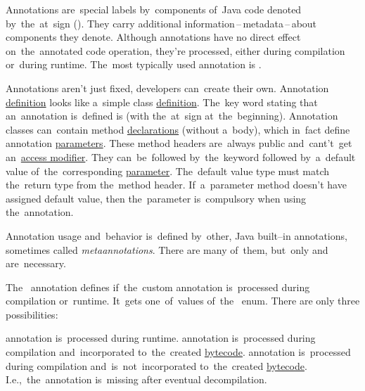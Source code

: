 
\label{javaabstractclasses}

\label{javainterfaces}

\label{javaannotation}
Annotations are~special labels by~components of~Java code denoted by~the~at~sign ().
They carry additional information\,--\,metadata\,--\,about components they denote.
Although annotations have no direct effect on~the~annotated code operation, they're processed, either during compilation or~during runtime.
The~most typically used annotation is \hyperref[javaoverride]{}.

\label{javacustomannotations}
Annotations aren't just fixed, developers can~create their own.
Annotation \hyperref[declarationdefinition]{definition} looks like a~simple class \hyperref[declarationdefinition]{definition}.
The~key word stating that an~annotation is~defined is  (with the~at~sign at~the~beginning).
Annotation classes can~contain method \hyperref[declarationdefinition]{declarations} (without a~body), which in~fact define annotation \hyperref[parameterargument]{parameters}.
These method headers are~always public and~cant't~get an~\hyperref[javaaccessmodifiers]{access modifier}.
They can~be~followed by~the~keyword  followed by~a~default value of~the~corresponding \hyperref[parameterargument]{parameter}.
The~default value type must match the~return type from the~method header.
If~a~parameter method doesn't have assigned default value, then the~parameter is~compulsory when using the~annotation.

Annotation usage and~behavior is~defined by~other, Java built--in annotations, sometimes called \textit{metaannotations}.
There are many of~them, but~only  and~ are~necessary.

The~ annotation defines if~the~custom annotation is~processed during compilation or~runtime.
It~gets one~of~values of~the~ enum.
There are only three possibilities:
\begin{itemize}
     annotation is~processed during runtime.
     annotation is~processed during compilation and~incorporated to~the~created \hyperref[bytecode]{bytecode}.
     annotation is~processed during compilation and~is~not~incorporated to~the~created \hyperref[bytecode]{bytecode}.
             I.e.,~the~annotation is~missing after eventual decompilation.
\end{itemize}

